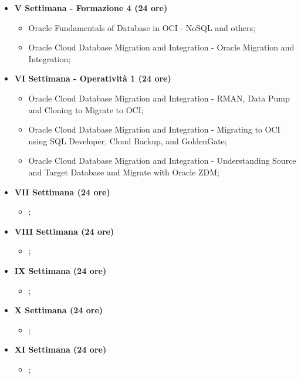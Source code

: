 {\begin{itemize}
        \item \textbf{V Settimana - Formazione 4 (24 ore)} 
        \begin{itemize}
            \item Oracle Fundamentals of Database in OCI - NoSQL and others;
            \item Oracle Cloud Database Migration and Integration - Oracle Migration and Integration;
        \end{itemize}

        \item \textbf{VI Settimana - Operatività 1 (24 ore)} 
        \begin{itemize}
            \item Oracle Cloud Database Migration and Integration - RMAN, Data Pump and Cloning to Migrate to OCI;
            \item Oracle Cloud Database Migration and Integration - Migrating to OCI using SQL Developer, Cloud Backup, and GoldenGate;    
            \item Oracle Cloud Database Migration and Integration - Understanding Source and Target Database and Migrate with Oracle ZDM;
        \end{itemize}

        \item \textbf{VII Settimana (24 ore)} 
        \begin{itemize}
            \item ;
        \end{itemize}

        \item \textbf{VIII Settimana (24 ore)} 
        \begin{itemize}
            \item ;
        \end{itemize}

        \item \textbf{IX Settimana (24 ore)} 
        \begin{itemize}
            \item ;
        \end{itemize}

        \item \textbf{X Settimana (24 ore)} 
        \begin{itemize}
            \item ;
        \end{itemize}

        \item \textbf{XI Settimana (24 ore)} 
        \begin{itemize}
            \item ;
        \end{itemize}


\end{itemize}}

